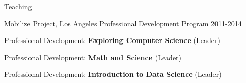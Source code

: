 \documentclass{resume} %
\begin{document}
\begin{rSection}{Teaching}
\begin{rSubsection}{Mobilize Project, Los Angeles }{ Professional Development Program }{2011-2014}{}
\item Professional Development: \textbf{Exploring Computer Science} (Leader)
\item  Professional Development: \textbf{Math and Science} (Leader)
\item Professional Development: \textbf{Introduction to Data Science} (Leader)
\end{rSubsection}


%


\end{rSection}
\end{document}

